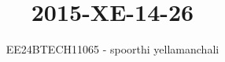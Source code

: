 \documentclass[journal]{IEEEtran}
\begin{document}

\vspace{3cm}

\title{2015-XE-14-26}
\author{EE24BTECH11065 - spoorthi yellamanchali}
{\let\newpage\relax\maketitle}

\renewcommand{\thefigure}{\theenumi}
\renewcommand{\thetable}{\theenumi}
\setlength{\intextsep}{10pt} %


\renewcommand{\thetable}{\theenumi}
\end{document}

